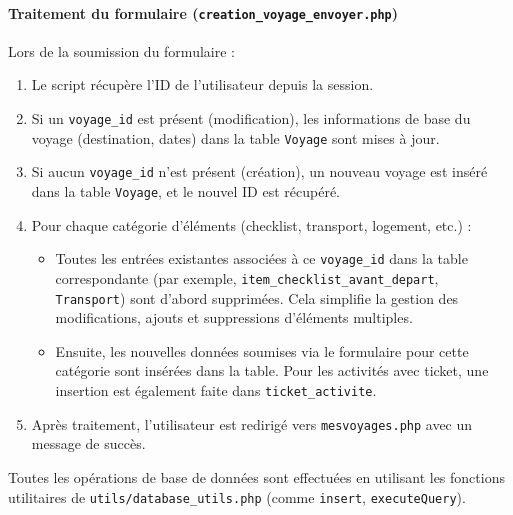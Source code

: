 \documentclass[a4paper,12pt]{article}
\begin{document}
\paragraph{Traitement du formulaire (\texttt{creation\_voyage\_envoyer.php})}
Lors de la soumission du formulaire :
\begin{enumerate}
    \item Le script récupère l'ID de l'utilisateur depuis la session.
    \item Si un \texttt{voyage\_id} est présent (modification), les informations de base du voyage (destination, dates) dans la table \texttt{Voyage} sont mises à jour.
    \item Si aucun \texttt{voyage\_id} n'est présent (création), un nouveau voyage est inséré dans la table \texttt{Voyage}, et le nouvel ID est récupéré.
    \item Pour chaque catégorie d'éléments (checklist, transport, logement, etc.) :
    \begin{itemize}
        \item Toutes les entrées existantes associées à ce \texttt{voyage\_id} dans la table correspondante (par exemple, \texttt{item\_checklist\_avant\_depart}, \texttt{Transport}) sont d'abord supprimées. Cela simplifie la gestion des modifications, ajouts et suppressions d'éléments multiples.
        \item Ensuite, les nouvelles données soumises via le formulaire pour cette catégorie sont insérées dans la table. Pour les activités avec ticket, une insertion est également faite dans \texttt{ticket\_activite}. 
    \end{itemize}
    
    \item Après traitement, l'utilisateur est redirigé vers \texttt{mesvoyages.php} avec un message de succès.
\end{enumerate}
Toutes les opérations de base de données sont effectuées en utilisant les fonctions utilitaires de \texttt{utils/database\_utils.php} (comme \texttt{insert}, \texttt{executeQuery}).
\end{document}
